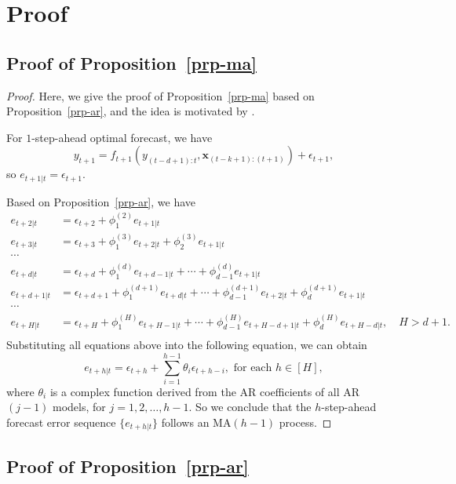 \documentclass[
  11pt,
  a4paper,
]{article}
\theoremstyle{plain}
\theoremstyle{remark}
\begin{document}
\section{Proof}\label{sec-proof}

\subsection{\texorpdfstring{Proof of
Proposition~\ref{prp-ma}}{Proof of Proposition~}}\label{sec-proof_ma}

\begin{proof}
Here, we give the proof of Proposition~\ref{prp-ma} based on
Proposition~\ref{prp-ar}, and the idea is motivated by
\textcite{sommer2023}.

For \(1\)-step-ahead optimal forecast, we have \[
y_{t+1} = f_{t+1}(y_{(t-d+1):t},\bm{x}_{(t-k+1):(t+1)}) + \epsilon_{t+1},
\] so \(e_{t+1|t}=\epsilon_{t+1}\).

Based on Proposition~\ref{prp-ar}, we have \[
\begin{aligned}
e_{t+2|t} &= \epsilon_{t+2} + \phi_{1}^{(2)}e_{t+1|t} \\
e_{t+3|t} &= \epsilon_{t+3} + \phi_{1}^{(3)}e_{t+2|t} + \phi_{2}^{(3)}e_{t+1|t} \\
\cdots \\
e_{t+d|t} &= \epsilon_{t+d} + \phi_{1}^{(d)}e_{t+d-1|t} + \cdots + \phi_{d-1}^{(d)}e_{t+1|t} \\
e_{t+d+1|t} &= \epsilon_{t+d+1} + \phi_{1}^{(d+1)}e_{t+d|t} + \cdots + \phi_{d-1}^{(d+1)}e_{t+2|t} + \phi_{d}^{(d+1)}e_{t+1|t} \\
\cdots \\
e_{t+H|t} &= \epsilon_{t+H} + \phi_{1}^{(H)}e_{t+H-1|t} + \cdots + \phi_{d-1}^{(H)}e_{t+H-d+1|t} + \phi_{d}^{(H)}e_{t+H-d|t}, \quad H > d + 1. \\
\end{aligned}
\] Substituting all equations above into the following equation, we can
obtain \[
e_{t+h|t} = \epsilon_{t+h} + \sum_{i=1}^{h-1}\theta_{i}\epsilon_{t+h-i}, \text{ for each } h\in[H],
\] where \(\theta_{i}\) is a complex function derived from the AR
coefficients of all AR\((j-1)\) models, for \(j = 1,2,\ldots,h-1\). So
we conclude that the \(h\)-step-ahead forecast error sequence
\(\{e_{t+h|t}\}\) follows an MA\((h-1)\) process.
\end{proof}

\subsection{\texorpdfstring{Proof of
Proposition~\ref{prp-ar}}{Proof of Proposition~}}\label{sec-proof_ar}
\end{document}
